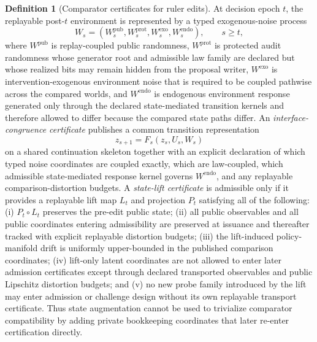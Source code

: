 \documentclass[11pt]{article}
\theoremstyle{definition}
\newtheorem{definition}[theorem]{Definition}
\newcommand{\1}{\mathbf{1}}
\begin{document}
\begin{definition}[Comparator certificates for ruler edits]\label{def:comp_cert}
At decision epoch $t$, the replayable post-$t$ environment is represented by a typed exogenous-noise process
\[
W_s=(W_s^{\mathrm{pub}},W_s^{\mathrm{prot}},W_s^{\mathrm{exo}},W_s^{\mathrm{endo}}),\qquad s\ge t,
\]
where $W^{\mathrm{pub}}$ is replay-coupled public randomness, $W^{\mathrm{prot}}$ is protected audit randomness whose generator root and admissible law family are declared but whose realized bits may remain hidden from the proposal writer, $W^{\mathrm{exo}}$ is intervention-exogenous environment noise that is required to be coupled pathwise across the compared worlds, and $W^{\mathrm{endo}}$ is endogenous environment response generated only through the declared state-mediated transition kernels and therefore allowed to differ because the compared state paths differ. An \emph{interface-congruence certificate} publishes a common transition representation
\[
z_{s+1}=F_s(z_s,U_s,W_s)
\]
on a shared continuation skeleton together with an explicit declaration of which typed noise coordinates are coupled exactly, which are law-coupled, which admissible state-mediated response kernel governs $W^{\mathrm{endo}}$, and any replayable comparison-distortion budgets. A \emph{state-lift certificate} is admissible only if it provides a replayable lift map $L_t$ and projection $P_t$ satisfying all of the following: (i) $P_t\circ L_t$ preserves the pre-edit public state; (ii) all public observables and all public coordinates entering admissibility are preserved at issuance and thereafter tracked with explicit replayable distortion budgets; (iii) the lift-induced policy-manifold drift is uniformly upper-bounded in the published comparison coordinates; (iv) lift-only latent coordinates are not allowed to enter later admission certificates except through declared transported observables and public Lipschitz distortion budgets; and (v) no new probe family introduced by the lift may enter admission or challenge design without its own replayable transport certificate. Thus state augmentation cannot be used to trivialize comparator compatibility by adding private bookkeeping coordinates that later re-enter certification directly.
\end{definition}
\end{document}
